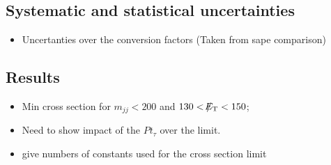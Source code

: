 \subsection{Systematic and statistical uncertainties}
\begin{itemize}
		\item Uncertanties over the conversion factors (Taken from sape comparison)
\end{itemize}
\subsection{Results}
\begin{itemize}
\item Min cross section for $m_{jj} < 200$ and $130 < \slash\mkern-12mu{E}_{\text{T}} < 150$;
\item Need to show impact of the $Pt_{\tau}$ over the limit.
\item give numbers of constants used for the cross section limit
\end{itemize}

